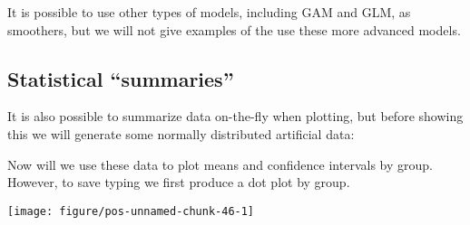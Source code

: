 \documentclass[paper=a4,headsepline,BCOR=12mm,twoside,open=right,%
titlepage,headings=small,fontsize=10pt,index=totoc,bibliography=totoc,%
captions=tableheading,captions=nooneline]{scrbook}\usepackage{knitr}
\begin{document}
It is possible to use other types of models, including GAM and GLM, as smoothers, but we will not give examples of the use these more advanced models.

\subsection{Statistical ``summaries''}

It is also possible to summarize data on-the-fly when plotting, but before showing this we will generate some normally distributed artificial data:

\begin{knitrout}\footnotesize
{}\color{fgcolor}\begin{kframe}
\begin{alltt}
 \hlkwb{<-} \hlstd{(}
   \hlstd{=} \hlstd{(}\hlstd{(}\hlstd{,} \hlstd{=}\hlstd{,} \hlstd{=}\hlstd{),}
        \hlstd{(}\hlstd{,} \hlstd{=}\hlstd{,} \hlstd{=}\hlstd{)),}
   \hlstd{=} \hlstd{(}\hlstd{(}\hlstd{(}\hlstd{,} \hlstd{),} \hlstd{(}\hlstd{,} \hlstd{)))}
  \hlstd{)}
\end{alltt}
\end{kframe}
\end{knitrout}

Now will we use these data to plot means and confidence intervals by group. However, to save typing we first produce a dot plot by group.

\begin{knitrout}\footnotesize
{}\color{fgcolor}\begin{kframe}
\begin{alltt}
 \hlkwb{<-} \hlstd{(} \hlstd{(}  \hlopt{+}
          \hlstd{()}
\end{alltt}
\end{kframe}

{\centering \texttt{[image: figure/pos-unnamed-chunk-46-1]} 

}



\end{knitrout}
\end{document}
